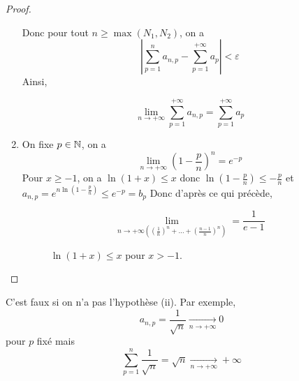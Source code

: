 \documentclass[12pt]{article}
\begin{document}
\begin{proof}
\begin{enumerate}
		Donc pour tout $n\geqslant\max\left(N_{1},N_{2}\right)$, on a 
		\begin{equation}\left\lvert\sum_{p=1}^{n}a_{n,p}-\sum_{p=1}^{+\infty}a_{p}\right\rvert<\varepsilon\end{equation}
		Ainsi,

		\begin{equation}\boxed{\lim\limits_{n\to+\infty}\sum_{p=1}^{+\infty}a_{n,p}=\sum_{p=1}^{+\infty}a_{p}}\end{equation}

		\item On fixe $p\in\mathbb{N}$, on a 
		\begin{equation}\lim\limits_{n\to+\infty}\left(1-\frac{p}{n}\right)^{n}=e^{-p}\end{equation}
		Pour $x\geqslant -1$, on a $\ln\left(1+x\right)\leqslant x$ donc $\ln\left(1-\frac{p}{n}\right)\leqslant -\frac{p}{n}$ et $a_{n,p}=e^{n\ln\left(1-\frac{p}{n}\right)}\leqslant e^{-p}=b_{p}$
		Donc d'après ce qui précède, 
		
		\begin{equation}\boxed{\lim\limits_{n\to+\infty\left(\left(\frac{1}{n}\right)^{n}+\dots+\left(\frac{n-1}{n}\right)^{n}\right)}=\frac{1}{e-1}}\end{equation}
		
		\begin{figure}[ht!]
			\centering
			\caption{$\ln\left(1+x\right)\leqslant x$ pour $x>-1$.}
		\end{figure}
	\end{enumerate}
\end{proof}

\begin{remark}
	C'est faux si on n'a pas l'hypothèse (ii). Par exemple, 
	\begin{equation}a_{n,p}=\frac{1}{\sqrt{n}}\xrightarrow[n\to+\infty]{}0\end{equation}
	pour $p$ fixé mais 
	\begin{equation}\sum_{p=1}^{n}\frac{1}{\sqrt{n}}=\sqrt{n}\xrightarrow[n\to+\infty]{}+\infty\end{equation}
\end{remark}
\end{document}
